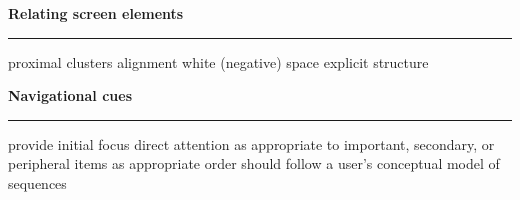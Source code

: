 \documentclass[pdf]{beamer}
\begin{document}
{{{{{{{{{{{\begin{frame}
\begin{tikzpicture}
      \end{tikzpicture}
\end{frame}



{
\begin{frame}
{\textbf{Relating screen elements}}{\textcolor{red}{\rule{12cm}{1.2pt}}}

\vspace{-2.5cm}

	{proximal clusters} \newline
    {alignment} \newline
    {white (negative) space}\newline
    {explicit structure}\newline
	
\end{frame}



\begin{frame}
{\textbf{Navigational cues}}{\textcolor{red}{\rule{12cm}{1.2pt}}}

    {provide initial focus} \newline \newline
	direct attention as appropriate to important, secondary, or \newline 
    peripheral items as appropriate \newline \newline
order should follow a user’s conceptual model of sequences \newline \newline


\end{frame}}}}}}}}}}}}}
\end{document}
